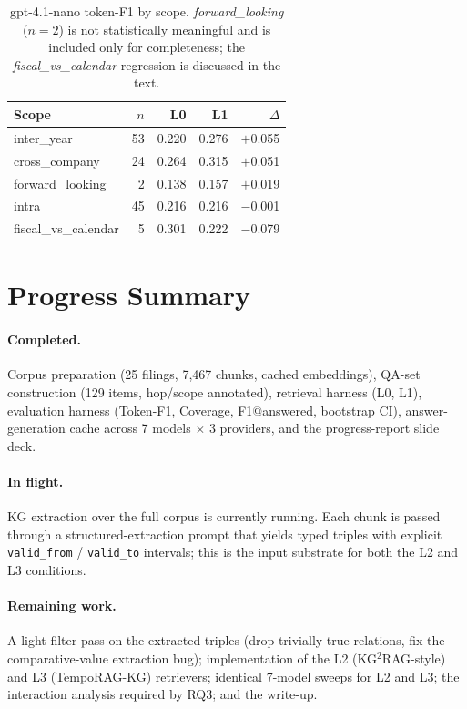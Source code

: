 \documentclass[11pt]{article}
\begin{document}
\begin{table}[h]
\centering
\small
\begin{tabular}{lr rr r}
\toprule
Scope & $n$ & L0    & L1    & $\Delta$ \\
\midrule
inter\_year          & 53 & 0.220 & 0.276 & $+$0.055 \\
cross\_company       & 24 & 0.264 & 0.315 & $+$0.051 \\
forward\_looking     &  2 & 0.138 & 0.157 & $+$0.019 \\
intra                & 45 & 0.216 & 0.216 & $-$0.001 \\
fiscal\_vs\_calendar &  5 & 0.301 & 0.222 & $-$0.079 \\
\bottomrule
\end{tabular}
\caption{gpt-4.1-nano token-F1 by scope.
\textit{forward\_looking} ($n=2$) is not statistically meaningful and
is included only for completeness; the \textit{fiscal\_vs\_calendar}
regression is discussed in the text.}
\label{tab:by-scope}
\end{table}

\section{Progress Summary}
\label{sec:progress}

\paragraph{Completed.}
Corpus preparation (25 filings, 7{,}467 chunks, cached embeddings),
QA-set construction (129 items, hop/scope annotated), retrieval
harness (L0, L1), evaluation harness (Token-F1, Coverage,
F1@answered, bootstrap CI), answer-generation cache across 7
models $\times$ 3 providers, and the progress-report slide deck.

\paragraph{In flight.}
KG extraction over the full corpus is currently running. Each
chunk is passed through a structured-extraction prompt that yields
typed triples with explicit \texttt{valid\_from} / \texttt{valid\_to}
intervals; this is the input substrate for both the L2 and L3
conditions.

\paragraph{Remaining work.}
A light filter pass on the extracted triples (drop trivially-true
relations, fix the comparative-value extraction bug); implementation
of the L2 (KG$^{2}$RAG-style) and L3 (TempoRAG-KG) retrievers;
identical 7-model sweeps for L2 and L3; the interaction analysis
required by RQ3; and the write-up.
\end{document}
